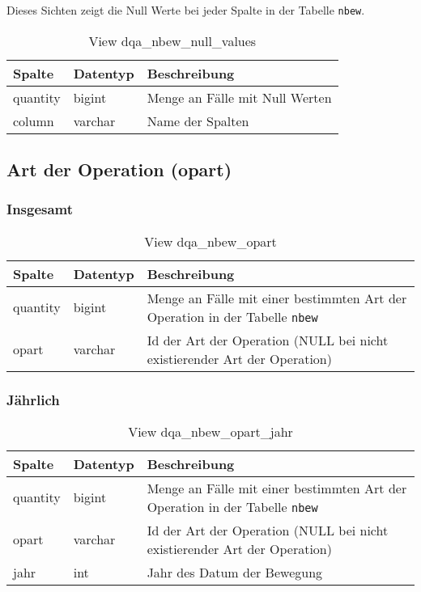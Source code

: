 Dieses Sichten zeigt die Null Werte bei jeder Spalte in der Tabelle \texttt{nbew}.

\begin{table}[ht]
	\centering   
	\caption{View dqa\_nbew\_null\_values}
	\label{tab:bewNull}
	\begin{tabular}{||l|l|p{10cm}||}   		
		\hline
		Spalte & Datentyp & Beschreibung \\ [0.5ex]
		\hline\hline
		quantity & bigint & Menge an Fälle mit Null Werten \\
		\hline
		column & varchar & Name der Spalten \\
		\hline		
	\end{tabular}
\end{table}

\subsection{Art der Operation (opart)} \label{subsec:bewOpart}

\subsubsection{Insgesamt} \label{subsubsec:bewOpartI}

\begin{table}[ht]
	\centering   
	\caption{View dqa\_nbew\_opart}
	\label{tab:bewOpartI}
	\begin{tabular}{||l|l|p{10cm}||}   		
		\hline
		Spalte & Datentyp & Beschreibung \\ [0.5ex]
		\hline\hline
		quantity & bigint & Menge an Fälle mit einer bestimmten Art der Operation in der Tabelle \texttt{nbew} \\
		\hline
		opart & varchar & Id der Art der Operation (NULL bei nicht existierender Art der Operation)\\
		\hline
	\end{tabular}
\end{table}
\newpage
\subsubsection{Jährlich} \label{subsubsec:bewOpartJ}

\begin{table}[ht]
	\centering   
	\caption{View dqa\_nbew\_opart\_jahr}
	\label{tab:bewOpartJ}
	\begin{tabular}{||l|l|p{10cm}||}   		
		\hline
		Spalte & Datentyp & Beschreibung \\ [0.5ex]
		\hline\hline
		quantity & bigint & Menge an Fälle mit einer bestimmten Art der Operation in der Tabelle \texttt{nbew}\\
		\hline
		opart & varchar & Id der Art der Operation (NULL bei nicht existierender Art der Operation)\\
		\hline
		jahr & int &  Jahr des Datum der Bewegung \\
		\hline		
	\end{tabular}
\end{table}


